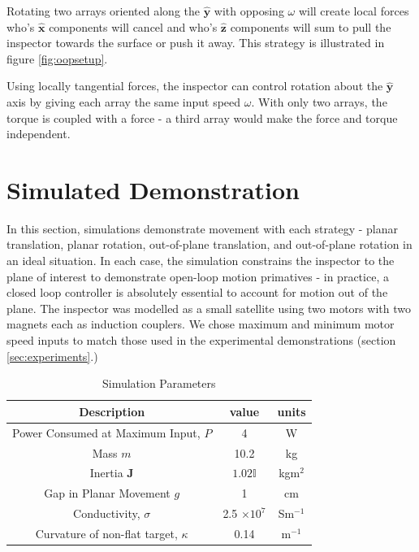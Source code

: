 \documentclass[letterpaper, 10 pt, conference]{ieeeconf}  %
\begin{document}
\par Rotating two arrays oriented along the $\hat{\textbf{y}}$ with opposing $\omega$ will create local forces who's $\hat{\textbf{x}}$ components will cancel and who's $\hat{\textbf{z}}$ components will sum to pull the inspector towards the surface or push it away. This strategy is illustrated in figure \ref{fig:oopsetup}.     
\par Using locally tangential forces, the inspector can control rotation about the $\hat{\textbf{y}}$ axis by giving each array the same input speed $\omega$. With only two arrays, the torque is coupled with a force - a third array would make the force and torque independent. 
   


\section{Simulated Demonstration}\label{sec:simulations}

In this section, simulations demonstrate movement with each strategy - planar translation, planar rotation, out-of-plane translation, and out-of-plane rotation in an ideal situation. In each case, the simulation constrains the inspector to the plane of interest to demonstrate open-loop motion primatives - in practice, a closed loop controller is absolutely essential to account for motion out of the plane. The inspector was modelled as a small satellite using two motors with two magnets each as induction couplers. We chose maximum and minimum motor speed inputs to match those used in the experimental demonstrations (section \ref{sec:experiments}.)     

\begin{table}[h]
\caption{Simulation Parameters}
\label{table: sim_params}
\begin{center}
\begin{tabular}{| c | c | c |}
\hline
Description & value & units \\
\hline \hline
Power Consumed at Maximum Input, $P$ & 4 & W \\ \hline

Mass $m$ & 10.2 & kg \\ \hline

Inertia $\textbf{J}$ & $1.02 \mathbb{I}$ & kgm$^2$ \\ \hline

Gap in Planar Movement $g$ & 1 & cm \\ \hline

Conductivity, $\sigma$ & 2.5 $\times 10^7$ & Sm$^{-1}$ \\ \hline

Curvature of non-flat target, $\kappa$  & 0.14 & m$^{-1}$\\

\hline
\end{tabular}
\end{center}
\end{table}
\end{document}
